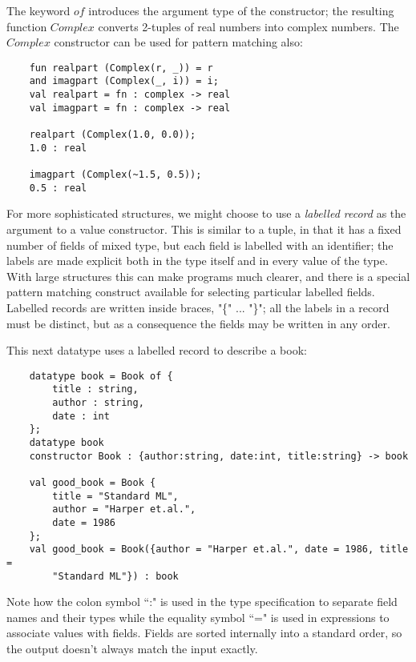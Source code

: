 The keyword $of$ introduces the argument type of the constructor; the
resulting function $Complex$ converts 2-tuples of real numbers into
complex numbers. The $Complex$ constructor can be used for pattern
matching also:
\begin{verbatim}
    fun realpart (Complex(r, _)) = r
    and imagpart (Complex(_, i)) = i;
    val realpart = fn : complex -> real
    val imagpart = fn : complex -> real

    realpart (Complex(1.0, 0.0));
    1.0 : real

    imagpart (Complex(~1.5, 0.5));
    0.5 : real
\end{verbatim}

For more sophisticated structures, we might choose to use a {\em labelled
record} as the argument to a value constructor. This is similar to a
tuple, in that it has a fixed number of fields of mixed type, but each
field is labelled with an identifier; the labels are made explicit both
in the type itself and in every value of the type. With large structures
this can make programs much clearer, and there is a special pattern
matching construct available for selecting particular labelled fields.
Labelled records are written inside braces, "\{" ... "\}"; all the labels
in a record must be distinct, but as a consequence the fields may be
written in any order.

This next datatype uses a labelled record to describe a book:
\begin{verbatim}
    datatype book = Book of {
        title : string,
        author : string,
        date : int
    };
    datatype book
    constructor Book : {author:string, date:int, title:string} -> book

    val good_book = Book {
        title = "Standard ML",
        author = "Harper et.al.",
        date = 1986
    };
    val good_book = Book({author = "Harper et.al.", date = 1986, title =
        "Standard ML"}) : book
\end{verbatim}

Note how the colon symbol ``:" is used in the type specification to
separate field names and their types while the equality symbol ``=" is
used in expressions to associate values with fields. Fields are sorted
internally into a standard order, so the output doesn't always match the
input exactly.

